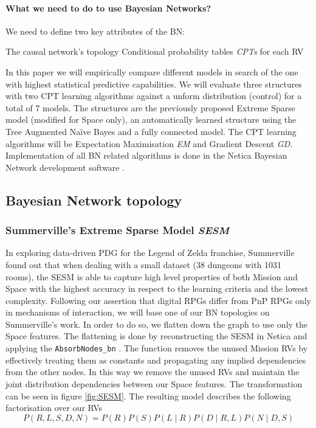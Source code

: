 \documentclass{UoYCSproject}
\begin{document}
\paragraph{What we need to do to use Bayesian Networks?}
We need to define two key attributes of the BN:
\begin{outline}[enumerate]
  \1 The causal network's topology
  \1 Conditional probability tables \textit{CPTs} for each RV
\end{outline}
In this paper we will empirically compare different models in search of the one with highest statistical predictive capabilities. We will evaluate three structures with two CPT learning algorithms against a unform distribution (control) for a total of 7 models. The structures are the previously proposed Extreme Sparse model \parencite{SummervilleSamplingHyrule} (modified for Space only), an automatically learned structure using the Tree Augmented Na\"{i}ve Bayes and a fully connected model. The CPT learning algorithms will be Expectation Maximisation \textit{EM} and Gradient Descent \textit{GD}. Implementation of all BN related algorithms is done in the Netica Bayesian Network development software \parencite{netica}.

\subsection{Bayesian Network topology}
\subsubsection{Summerville's Extreme Sparse Model \textit{SESM}}
In exploring data-driven PDG for the Legend of Zelda franchise, Summerville found out that when dealing with a small dataset (38 dungeons with 1031 rooms), the SESM is able to capture high level properties of both Mission and Space with the highest accuracy in respect to the learning criteria and the lowest complexity. Following our assertion that digital RPGs differ from PnP RPGs only in mechanisms of interaction, we will base one of our BN topologies on Summerville's work. In order to do so, we flatten down the graph to use only the Space features. The flattening is done by reconstructing the SESM in Netica and applying the \texttt{AbsorbNodes\_bn} \parencite[62-63]{neticaCman}. The function removes the unused Mission RVs by effectively treating them as constants and propagating any implied dependencies from the other nodes. In this way we remove the unused RVs and maintain the joint distribution dependencies between our Space features. The transformation can be seen in figure \ref{fig:SESM}. The resulting model describes the following factorisation over our RVs
\begin{equation}
  \label{eq:SESM}
  P(R,L,S,D,N) = P(R)P(S)P(L \mid R)P(D \mid R, L)P(N \mid D, S)
\end{equation}
\end{document}
